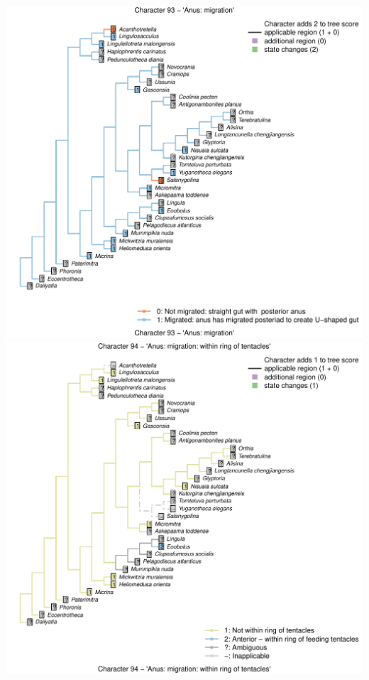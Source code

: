 \documentclass[]{book}
\theoremstyle{definition}
\theoremstyle{definition}
\theoremstyle{definition}
\theoremstyle{remark}
\begin{document}
\includegraphics{Brachiopod_phylogeny_files/figure-latex/unnamed-chunk-4-93.pdf}
\includegraphics{Brachiopod_phylogeny_files/figure-latex/unnamed-chunk-4-94.pdf}
\end{document}
